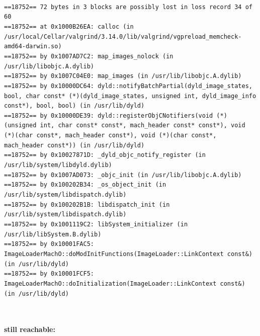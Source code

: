 \documentclass{mwart}
\begin{document}
\begin{scriptsize}
\noindent \texttt{\noindent 
\\==18752== 72 bytes in 3 blocks are possibly lost in loss record 34 of 60
\\==18752==    at 0x1000B26EA: calloc (in /usr/local/Cellar/valgrind/3.14.0/lib/valgrind/vgpreload\_memcheck-amd64-darwin.so)
\\==18752==    by 0x1007AD7C2: map\_images\_nolock (in /usr/lib/libobjc.A.dylib)
\\==18752==    by 0x1007C04E0: map\_images (in /usr/lib/libobjc.A.dylib)
\\==18752==    by 0x10000DC64: dyld::notifyBatchPartial(dyld\_image\_states, bool, char const* (*)(dyld\_image\_states, unsigned int, dyld\_image\_info const*), bool, bool) (in /usr/lib/dyld)
\\==18752==    by 0x10000DE39: dyld::registerObjCNotifiers(void (*)(unsigned int, char const* const*, mach\_header const* const*), void (*)(char const*, mach\_header const*), void (*)(char const*, mach\_header const*)) (in /usr/lib/dyld)
\\==18752==    by 0x10027871D: \_dyld\_objc\_notify\_register (in /usr/lib/system/libdyld.dylib)
\\==18752==    by 0x1007AD073: \_objc\_init (in /usr/lib/libobjc.A.dylib)
\\==18752==    by 0x100202B34: \_os\_object\_init (in /usr/lib/system/libdispatch.dylib)
\\==18752==    by 0x100202B1B: libdispatch\_init (in /usr/lib/system/libdispatch.dylib)
\\==18752==    by 0x1001119C2: libSystem\_initializer (in /usr/lib/libSystem.B.dylib)
\\==18752==    by 0x10001FAC5: ImageLoaderMachO::doModInitFunctions(ImageLoader::LinkContext const\&) (in /usr/lib/dyld)
\\==18752==    by 0x10001FCF5: ImageLoaderMachO::doInitialization(ImageLoader::LinkContext const\&) (in /usr/lib/dyld)
}
\end{scriptsize}
\\

\paragraph{still reachable:}\mbox{}
\end{document}
